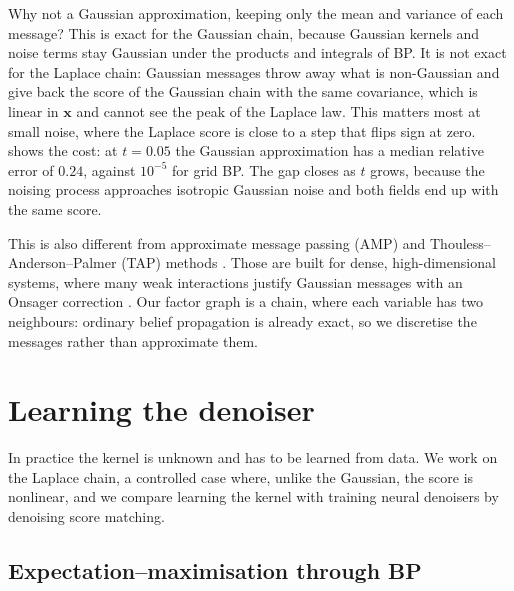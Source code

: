 \documentclass{article}
\begin{document}
Why not a Gaussian approximation, keeping only the mean and variance of each message? This is exact for the Gaussian
chain, because Gaussian kernels and noise terms stay Gaussian under the products and integrals of BP. It is not exact
for the Laplace chain: Gaussian messages throw away what is non-Gaussian and give back the score of the Gaussian chain
with the same covariance, which is linear in $\mathbf x$ and cannot see the peak of the Laplace law. This matters most at
small noise, where the Laplace score is close to a step that flips sign at zero.  shows the
cost: at $t=0.05$ the Gaussian approximation has a median relative error of $0.24$, against $10^{-5}$ for grid BP. The
gap closes as $t$ grows, because the noising process approaches isotropic Gaussian noise and both fields end up with the
same score.

This is also different from approximate message passing (AMP) and Thouless--Anderson--Palmer (TAP) methods
\cite{thouless1977solution,mezard1986sk,kabashima2003cdma,donoho2009message,krzakala2012statistical,bolthausen2014iterative}.
Those are built for dense, high-dimensional systems, where many weak interactions justify Gaussian messages with an
Onsager correction \cite{zdeborova2016statistical,mezard2017meanfield,lauditi2023sparse}. Our factor graph is a chain,
where each variable has two neighbours: ordinary belief propagation is already exact, so we discretise the messages
rather than approximate them.

\section{Learning the denoiser}
\label{sec:learning}

In practice the kernel is unknown and has to be learned from data. We work on the Laplace chain, a controlled case where,
unlike the Gaussian, the score is nonlinear, and we compare learning the kernel with training neural denoisers by
denoising score matching.

\subsection{Expectation--maximisation through BP}
\label{sec:em}
\end{document}
